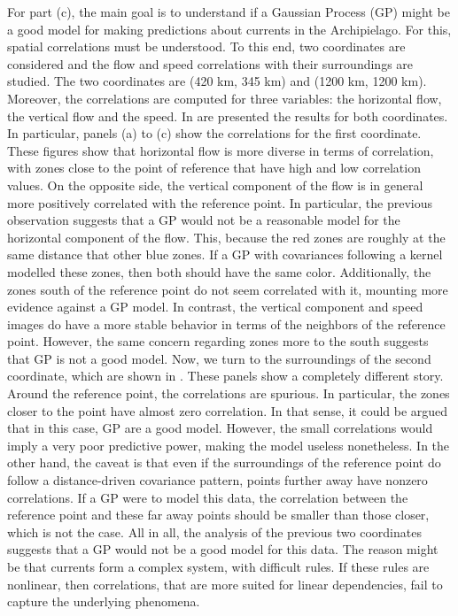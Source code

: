 \documentclass[11pt, english]{article}
\begin{document}
\begin{multicols}{2}
For part (c), the main goal is to understand if a Gaussian Process (GP) might be a good model for making predictions about currents in the Archipielago. For this, spatial correlations must be understood. To this end, two coordinates are considered and the flow and speed correlations with their surroundings are studied. The two coordinates are (420 km, 345 km) and (1200 km, 1200 km). Moreover, the correlations are computed for three variables: the horizontal flow, the vertical flow and the speed. In  are presented the results for both coordinates. In particular, panels (a) to (c) show the correlations for the first coordinate. These figures show that horizontal flow is more diverse in terms of correlation, with zones close to the point of reference that have high and low correlation values. On the opposite side, the vertical component of the flow is in general more positively correlated with the reference point. In particular, the previous observation suggests that a GP would not be a reasonable model for the horizontal component of the flow. This, because the red zones are roughly at the same distance that other blue zones. If a GP with covariances following a kernel modelled these zones, then both should have the same color. Additionally, the zones south of the reference point do not seem correlated with it, mounting more evidence against a GP model. In contrast, the vertical component and speed images do have a more stable behavior in terms of the neighbors of the reference point. However, the same concern regarding zones more to the south suggests that GP is not a good model. Now, we turn to the surroundings of the second coordinate, which are shown in . These panels show a completely different story. Around the reference point, the correlations are spurious. In particular, the zones closer to the point have almost zero correlation. In that sense, it could be argued that in this case, GP are a good model. However, the small correlations would imply a very poor predictive power, making the model useless nonetheless. In the other hand, the caveat is that even if the surroundings of the reference point do follow a distance-driven covariance pattern, points further away have nonzero correlations. If a GP were to model this data, the correlation between the reference point and these far away points should be smaller than those closer, which is not the case. All in all, the analysis of the previous two coordinates suggests that a GP would not be a good model for this data. The reason might be that currents form a complex system, with difficult rules. If these rules are nonlinear, then correlations, that are more suited for linear dependencies, fail to capture the underlying phenomena.


\end{multicols}
\end{document}
